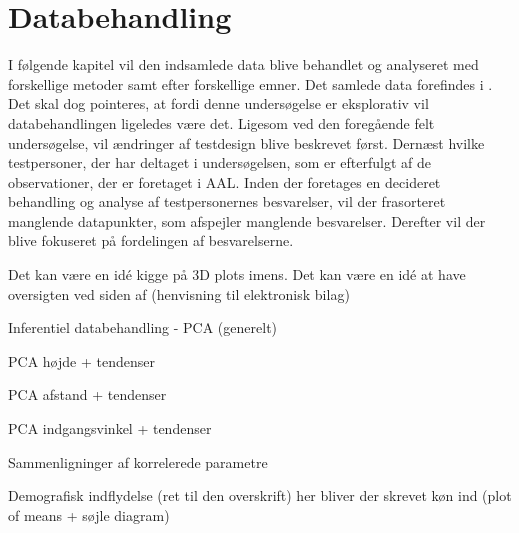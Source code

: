 \chapter{Databehandling}
\label{TestAfSkalaDatabehandling}
%
I følgende kapitel vil den indsamlede data blive behandlet og analyseret med forskellige metoder samt efter forskellige emner. Det samlede data forefindes i . Det skal dog pointeres, at fordi denne undersøgelse er eksplorativ vil databehandlingen ligeledes være det. Ligesom ved den foregående felt undersøgelse, vil ændringer af testdesign blive beskrevet først. Dernæst hvilke testpersoner, der har deltaget i undersøgelsen, som er efterfulgt af de observationer, der er foretaget i AAL. Inden der foretages en decideret behandling og analyse af testpersonernes besvarelser, vil der frasorteret manglende datapunkter, som afspejler manglende besvarelser. Derefter vil der blive fokuseret på fordelingen af besvarelserne.      




Det kan være en idé kigge på 3D plots imens. 
Det kan være en idé at have oversigten ved siden af (henvisning til elektronisk bilag)




Inferentiel databehandling - PCA (generelt) 

PCA højde + tendenser

PCA afstand + tendenser

PCA indgangsvinkel + tendenser

Sammenligninger af korrelerede parametre

Demografisk indflydelse (ret til den overskrift) her bliver der skrevet køn ind (plot of means + søjle diagram)